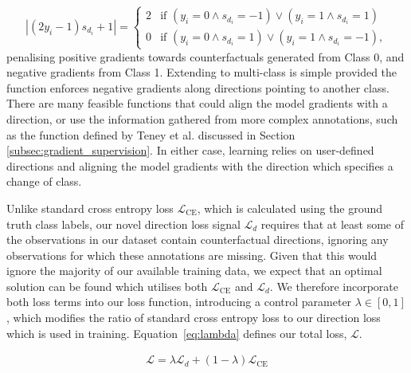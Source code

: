 \documentclass[sigconf,anonymous]{aamas}
\DeclareMathOperator*{\argmin}{arg\,min}
\begin{document}
\begin{equation}
    |(2y_i - 1)s_{d_i} + 1| = 
    \begin{cases}
        2 & \text{if } (y_i = 0 \land s_{d_i} = -1) \lor (y_i = 1 \land s_{d_i} = 1) \\
        0 & \text{if } (y_i = 0 \land s_{d_i} = 1) \lor (y_i = 1 \land s_{d_i} = -1),
    \end{cases}
\end{equation}
penalising positive gradients towards counterfactuals generated from Class 0, and negative gradients from Class 1. Extending to multi-class is simple provided the function enforces negative gradients along directions pointing to another class. There are many feasible functions that could align the model gradients with a direction, or use the information gathered from more complex annotations, such as the function defined by Teney et al. \cite{teney2020learning} discussed in Section \ref{subsec:gradient_supervision}. In either case, learning relies on user-defined directions and aligning the model gradients with the direction which specifies a change of class.

Unlike standard cross entropy loss $\mathcal{L}_{\textrm{CE}}$, which is calculated using the ground truth class labels, our novel direction loss signal $\mathcal{L}_{d}$ requires that at least some of the observations in our dataset contain counterfactual directions, ignoring any observations for which these annotations are missing. Given that this would ignore the majority of our available training data, we expect that an optimal solution can be found which utilises both $\mathcal{L}_{\textrm{CE}}$ and $\mathcal{L}_{d}$. We therefore incorporate both loss terms into our loss function, introducing a control parameter $\lambda \in [0,1]$, which modifies the ratio of standard cross entropy loss to our direction loss which is used in training. Equation~\ref{eq:lambda} defines our total loss, $\mathcal{L}$.

\begin{align}\label{eq:lambda}
    \mathcal{L} = \lambda \mathcal{L}_{d} + (1-\lambda)\mathcal{L}_{\textrm{CE}}
\end{align}


\end{document}
